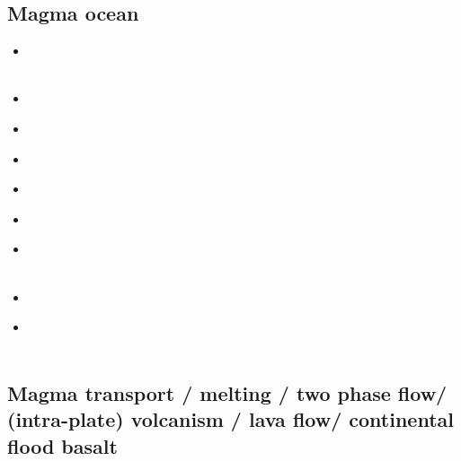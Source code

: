 \subsection{Magma ocean}

\begin{scriptsize}
\begin{itemize}
\item[\nineteenninetythree] 
\textcite{sost93a} \\
\textcite{sost93b} \\
\item[\twothousandtwo] 
\textcite{elvh02} \\
\item[\twothousandsix] 
\textcite{hosh06} \\
\item[\twothousandseven] 
\textcite{solo07} \\
\item[\twothousandten] 
\textcite{devv10} \\
\item[\twothousandtwelve] 
\textcite{ullc12} \\
\item[\twothousandthirteen] 
\textcite{plth13}  \\
\textcite{moha13} \\
\item[\twothousandfifteen] 
\textcite{maha15} \\
\item[\twothousandtwenty] 
\textcite{bobm20} \\
\textcite{agml20} \\
\end{itemize}
\end{scriptsize}

\subsection{Magma transport / melting / two phase flow/ (intra-plate) volcanism / lava flow/ 
continental flood basalt}

